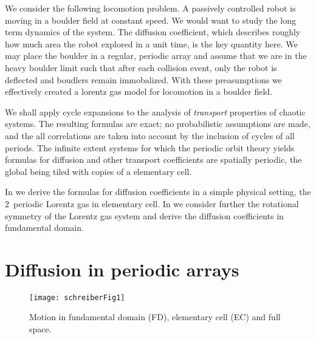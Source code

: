 \documentclass[aps,pre,preprint,groupedaddress, floatfix]{revtex4-1}
\begin{document}
We consider the following locomotion problem. A passively controlled robot is moving in a boulder field at constant speed. We would want to study the long term dynamics of the system. The diffusion coefficient, which describes roughly how much area the robot explored in a unit time, is the key quantity here. We may place the boulder in a regular, periodic array and assume that we are in the heavy boulder limit such that after each collision event, only the robot is deflected and boudlers remain immobalized. With these preasumptions we effectively created a lorentz gas model for locomotion in a boulder field.

We shall apply cycle expansions to the analysis of {\em transport} properties of
chaotic systems. The resulting formulas are exact; no probabilistic assumptions
are made, and the all correlations are taken into account by the inclusion of
cycles of all periods.  The infinite extent systems for which the periodic orbit
theory yields formulas for diffusion and other transport coefficients are
spatially periodic, the global {\statesp} being tiled with copies of a
elementary cell.

In  we derive the formulas for diffusion
coefficients in a simple physical setting, the $2$\dmn\ periodic Lorentz
gas in elementary cell. In we consider further the rotational symmetry of the Lorentz gas system and derive the diffusion coefficients in fundamental domain.

\section{Diffusion in periodic arrays}
\label{s-DiffPerArr}


\begin{figure}[htbp]
\begin{center}
\texttt{[image: schreiberFig1]}
\end{center}
\caption[]{\label{fig:schrieberFig1}}
Motion in fundamental domain (FD), elementary cell (EC) and full space.
\end{figure}
\end{document}

